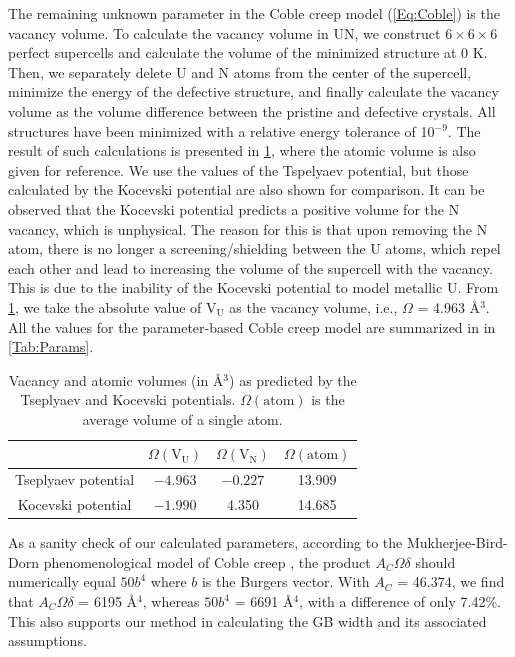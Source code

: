 \documentclass[preprint, 12pt]{elsarticle}
\newcommand{\?}{\stackrel{?}{=}}
\begin{document}
The remaining unknown parameter in the Coble creep model (\cref{Eq:Coble}) is the vacancy volume. To calculate the vacancy volume in UN, we construct $6 \times 6 \times 6$ perfect supercells and calculate the volume of the minimized structure at 0 K. Then, we separately delete U and N atoms from the center of the supercell, minimize the energy of the defective structure, and finally calculate the vacancy volume as the volume difference between the pristine and defective crystals. All structures have been minimized with a relative energy tolerance of 10$^{-9}$. The result of such calculations is presented in \cref{Tab:VacancyVolume}, where the atomic volume is also given for reference. We use the values of the Tspelyaev potential, but those calculated by the Kocevski potential are also shown for comparison. It can be observed that the Kocevski potential predicts a positive volume for the N vacancy, which is unphysical. The reason for this is that upon removing the N atom, there is no longer a screening/shielding between the U atoms, which repel each other and lead to increasing the volume of the supercell with the vacancy. This is due to the inability of the Kocevski potential to model metallic U. From \cref{Tab:VacancyVolume}, we take the absolute value of $\text{V}_\text{U}$ as the vacancy volume, i.e., $\Omega$ = 4.963 \AA$^3$. All the values for the parameter-based Coble creep model are summarized in in \cref{Tab:Params}.

\begin{table}[h!]
\centering
\caption{Vacancy and atomic volumes (in \AA$^3$) as predicted by the Tseplyaev and Kocevski potentials. $\Omega(\mathrm{atom})$ is the average volume of a single atom.}
\footnotesize
\begin{tabular}{cccc}
\hline
                    & $\Omega(\mathrm{V}_\mathrm{U})$ & $\Omega(\mathrm{V}_\mathrm{N})$  & $\Omega(\mathrm{atom})$ \\
\hline
Tseplyaev potential & $-4.963$      & $-0.227$       & 13.909 \\
Kocevski potential  & $-1.990$      & 4.350          & 14.685 \\
\hline
\end{tabular}
\label{Tab:VacancyVolume}
\end{table}

As a sanity check of our calculated parameters, according to the Mukherjee-Bird-Dorn phenomenological model of Coble creep \cite{Mukherjee2002}, the product $A_C \Omega \delta$ should numerically equal $50b^4$ where $b$ is the Burgers vector. With $A_C$ = 46.374, we find that $A_C \Omega \delta$ = 6195 \AA$^4$, whereas $50b^4$ = 6691 \AA$^4$, with a difference of only 7.42\%. This also supports our method in calculating the GB width and its associated assumptions.
\end{document}
